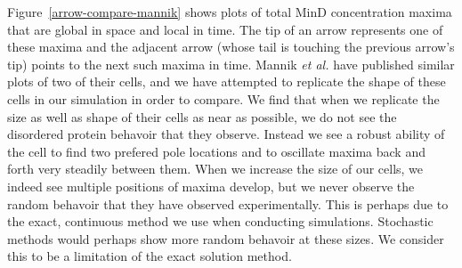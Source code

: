 \documentclass[letterpaper,twocolumn,amsmath,amssymb,pre]{revtex4-1}
\begin{document}
Figure~\ref{arrow-compare-mannik} shows plots of total MinD
concentration maxima that are global in space and local in time.  The
tip of an arrow represents one of these maxima and the adjacent arrow
(whose tail is touching the previous arrow's tip) points to the next
such maxima in time.  Mannik \emph{et al.} have published similar
plots of two of their cells, and we have attempted to replicate the
shape of these cells in our simulation in order to compare.  We find
that when we replicate the size as well as shape of their cells as
near as possible, we do not see the disordered protein behavoir that
they observe.  Instead we see a robust ability of the cell to find two
prefered pole locations and to oscillate maxima back and forth very
steadily between them.  When we increase the size of our cells, we
indeed see multiple positions of maxima develop, but we never observe
the random behavoir that they have observed experimentally.  This is
perhaps due to the exact, continuous method we use when conducting
simulations.  Stochastic methods would perhaps show more random
behavoir at these sizes.  We consider this to be a limitation of the
exact solution method.



\end{document}
